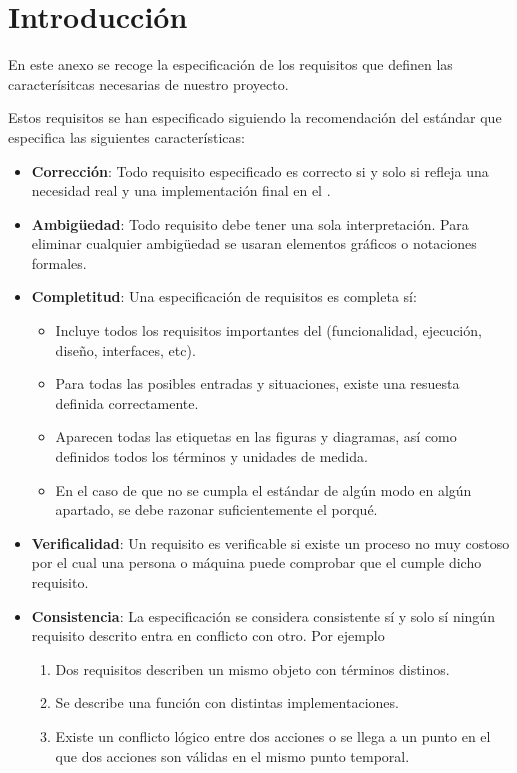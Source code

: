 
\section{Introducción}

En este anexo se recoge la especificación de los requisitos que definen las caracterísitcas necesarias de nuestro proyecto.

Estos requisitos se han especificado siguiendo la recomendación del estándar   que especifica las siguientes características:

\begin{itemize}
  \item \textbf{Corrección}: Todo requisito especificado es correcto si y solo si refleja una necesidad real y una implementación final en el .

  \item \textbf{Ambigüedad}: Todo requisito debe tener una sola interpretación. Para eliminar cualquier ambigüedad se usaran elementos gráficos o notaciones formales.

  \item \textbf{Completitud}: Una especificación de requisitos es completa sí:
        \begin{itemize}
          \item Incluye todos los requisitos importantes del  (funcionalidad, ejecución, diseño, interfaces, etc).
          \item Para todas las posibles entradas y situaciones, existe una resuesta definida correctamente.
          \item Aparecen todas las etiquetas en las figuras y diagramas, así como definidos todos los términos y unidades de medida.
          \item En el caso de que no se cumpla el estándar de algún modo en algún apartado, se debe razonar suficientemente el porqué.
        \end{itemize}

  \item \textbf{Verificalidad}: Un requisito es verificable si existe un proceso no muy costoso por el cual una persona o máquina puede comprobar que el  cumple dicho requisito.

  \item \textbf{Consistencia}: La especificación se considera consistente sí y solo sí ningún requisito descrito entra en conflicto con otro. Por ejemplo
        \begin{enumerate}
          \item Dos requisitos describen un mismo objeto con términos distinos.
          \item Se describe una función con distintas implementaciones.
          \item Existe un conflicto lógico entre dos acciones o se llega a un punto en el que dos acciones son válidas en el mismo punto temporal.
        \end{enumerate}


\end{itemize}
